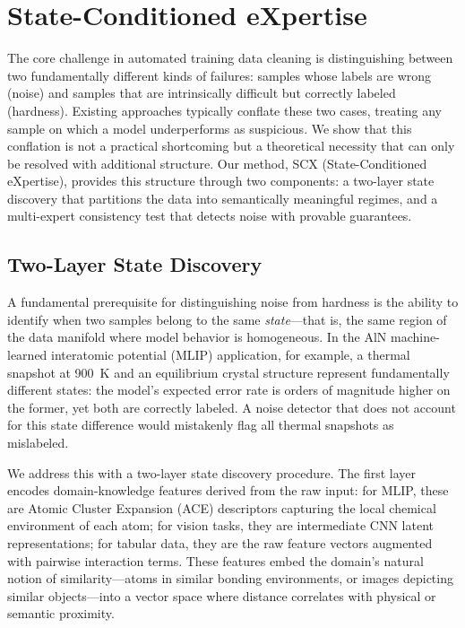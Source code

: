%

\section{State-Conditioned eXpertise}
\label{sec:method}

The core challenge in automated training data cleaning is distinguishing between two fundamentally different kinds of failures: samples whose labels are wrong (noise) and samples that are intrinsically difficult but correctly labeled (hardness). Existing approaches typically conflate these two cases, treating any sample on which a model underperforms as suspicious. We show that this conflation is not a practical shortcoming but a theoretical necessity that can only be resolved with additional structure. Our method, SCX (State-Conditioned eXpertise), provides this structure through two components: a two-layer state discovery that partitions the data into semantically meaningful regimes, and a multi-expert consistency test that detects noise with provable guarantees.

\subsection{Two-Layer State Discovery}
\label{sec:two_layer}

A fundamental prerequisite for distinguishing noise from hardness is the ability to identify when two samples belong to the same \emph{state}---that is, the same region of the data manifold where model behavior is homogeneous. In the AlN machine-learned interatomic potential (MLIP) application, for example, a thermal snapshot at 900~K and an equilibrium crystal structure represent fundamentally different states: the model's expected error rate is orders of magnitude higher on the former, yet both are correctly labeled. A noise detector that does not account for this state difference would mistakenly flag all thermal snapshots as mislabeled.

We address this with a two-layer state discovery procedure. The first layer encodes domain-knowledge features derived from the raw input: for MLIP, these are Atomic Cluster Expansion (ACE) descriptors capturing the local chemical environment of each atom; for vision tasks, they are intermediate CNN latent representations; for tabular data, they are the raw feature vectors augmented with pairwise interaction terms. These features embed the domain's natural notion of similarity---atoms in similar bonding environments, or images depicting similar objects---into a vector space where distance correlates with physical or semantic proximity.

